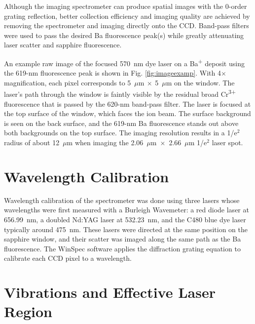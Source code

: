 Although the imaging spectrometer can produce spatial images with the 0-order grating reflection, better collection efficiency and imaging quality are achieved by removing the spectrometer and imaging directly onto the CCD.  Band-pass filters were used to pass the desired Ba fluorescence peak(s) while greatly attenuating laser scatter and sapphire fluorescence.

An example raw image of the focused 570~nm dye laser on a Ba\textsuperscript{+} deposit using the 619-nm fluorescence peak is shown in Fig. \ref{fig:imageexamp}.  With 4$\times$ magnification, each pixel corresponds to 5~$\mu$m$~\times~$5~$\mu$m on the window.  The laser's path through the window is faintly visible by the residual broad Cr\textsuperscript{3+} fluorescence that is passed by the 620-nm band-pass filter.  The laser is focused at the top surface of the window, which faces the ion beam.  The surface background is seen on the back surface, and the 619-nm Ba fluorescence stands out above both backgrounds on the top surface.  The imaging resolution results in a 1/e$^{2}$ radius of about 12~$\mu$m when imaging the 2.06~$\mu$m~$\times$~2.66~$\mu$m 1/e$^{2}$ laser spot.

\section{Wavelength Calibration}

Wavelength calibration of the spectrometer was done using three lasers whose wavelengths were first measured with a Burleigh Wavemeter:  a red diode laser at 656.99~nm, a doubled Nd:YAG laser at 532.23~nm, and the C480 blue dye laser typically around 475~nm.  These lasers were directed at the same position on the sapphire window, and their scatter was imaged along the same path as the Ba fluorescence.  The WinSpec software applies the diffraction grating equation to calibrate each CCD pixel to a wavelength.

\section{Vibrations and Effective Laser Region}
\label{sec:vibes}

